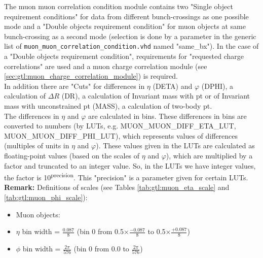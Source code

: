 The muon muon correlation condition module contains two "Single object requirement conditions" for data from different bunch-crossings as one possible mode
and a "Double objects requirement condition" for muon objects at same bunch-crossing as a second mode (selection is done by a parameter in the
generic list of \texttt{muon\_muon\_correlation\_condition.vhd} named "same\_bx"). In the case of a "Double objects requirement condition", requirements for "requested charge correlations" are used and a muon charge correlation module (see \ref{sec:gtl:muon_charge_correlation_module}) is required.\\
In addition there are "Cuts" for differences in $\eta$ (DETA) and $\varphi$ (DPHI), a calculation of $\Delta$$R$ (DR), a calculation of Invariant mass with pt or of Invariant mass with unconstrained pt (MASS), a calculation of two-body pt.\\
The differences in $\eta$ and $\varphi$ are calculated in bins. These differences in bins are converted to numbers (by LUTs, e.g. \small{MUON\_MUON\_DIFF\_ETA\_LUT, MUON\_MUON\_DIFF\_PHI\_LUT}\normalsize), which represents values of differences (multiples of units in $\eta$ and $\varphi$).
These values given in the LUTs are calculated as floating-point values (based on the scales of $\eta$ and $\varphi$), which are multiplied by a factor and truncated to an integer value.
So, in the LUTs we have integer values, the factor is 10\textsuperscript{\tiny{precision}\normalsize}. This "precision" is a parameter given for certain LUTs.\\

\textbf{Remark:} Definitions of scales (see Tables \ref{tab:gtl:muon_eta_scale} and \ref{tab:gtl:muon_phi_scale}):
\begin{itemize}
\item Muon objects:
\item $\eta$ bin width = $\frac{0.087}{8}$ (bin 0 from \small{0.5}$\times\frac{-0.087}{8}$ to \small{0.5}$\times\frac{+0.087}{8}$)
\item $\phi$ bin width = $\frac{2\pi}{576}$ (bin 0 from 0.0 to $\frac{2\pi}{576}$)
\end{itemize}

